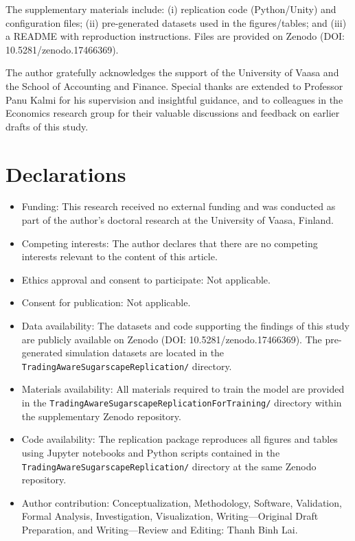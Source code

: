 \documentclass[pdflatex,sn-mathphys-num]{sn-jnl}%
\theoremstyle{thmstyleone}%
\theoremstyle{thmstyletwo}%
\theoremstyle{thmstylethree}%
\begin{document}
\backmatter


The supplementary materials include: (i) replication code (Python/Unity) and
configuration files; (ii) pre-generated datasets used in the figures/tables; and (iii) a README with reproduction instructions. Files are provided on Zenodo (DOI: 10.5281/zenodo.17466369).


The author gratefully acknowledges the support of the University of Vaasa and the School of Accounting and Finance. 
Special thanks are extended to Professor Panu Kalmi for his supervision and insightful guidance, and to colleagues in the Economics research group for their valuable discussions and feedback on earlier drafts of this study.

\section*{Declarations}

\begin{itemize}
\item Funding: This research received no external funding and was conducted as part of the author’s doctoral research at the University of Vaasa, Finland.
\item Competing interests: The author declares that there are no competing interests relevant to the content of this article.
\item Ethics approval and consent to participate: Not applicable.
\item Consent for publication: Not applicable.
\item Data availability: The datasets and code supporting the findings of this study are publicly available on Zenodo (DOI: 10.5281/zenodo.17466369). 
  The pre-generated simulation datasets are located in the \texttt{TradingAwareSugarscapeReplication/} directory.
\item Materials availability:  All materials required to train the model are provided in the \texttt{TradingAwareSugarscapeReplicationForTraining/} directory within the supplementary Zenodo repository.
\item Code availability: The replication package reproduces all figures and tables using Jupyter notebooks and Python scripts contained in the \texttt{TradingAwareSugarscapeReplication/} directory at the same Zenodo repository.
\item Author contribution: Conceptualization, Methodology, Software, Validation, Formal Analysis, Investigation, Visualization, Writing—Original Draft Preparation, and Writing—Review and Editing: Thanh Binh Lai.
\end{itemize}


\end{document}
